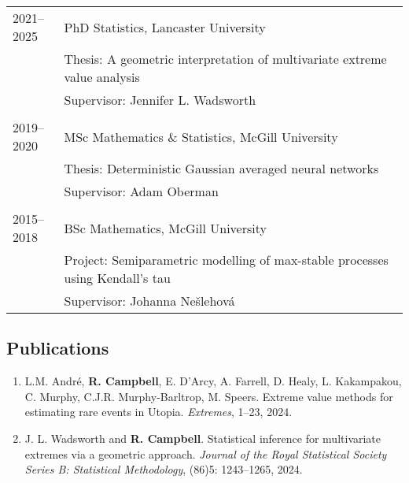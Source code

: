 \documentclass[11pt,]{scrartcl}
\begin{document}
\begin{table}[h]
{\def\arraystretch{1.1}\tabcolsep=0pt
\begin{tabular}{p{0.13\linewidth}p{0.87\linewidth}}

  {2021--2025} & PhD Statistics, Lancaster University \\
  & Thesis: A geometric interpretation of multivariate extreme value analysis\\
  & Supervisor: Jennifer L. Wadsworth \\ \\
  
  {2019--2020}  & MSc Mathematics \& Statistics, McGill University \\
  & Thesis: Deterministic Gaussian averaged neural networks \\
  & Supervisor: Adam Oberman \\  \\

  2015--2018 & BSc Mathematics, McGill University \\
  & Project: Semiparametric modelling of max-stable processes using Kendall's tau \\
  & Supervisor: Johanna Ne\v{s}lehov\'{a} \\

\end{tabular}%
}
\end{table}


\subsection{Publications}
\begin{enumerate}
  \leftskip-0.13in %
  \item L.M. André, \textbf{R. Campbell}, E. D'Arcy, A. Farrell, D. Healy, L. Kakampakou, C. Murphy, C.J.R. Murphy-Barltrop, M. Speers. Extreme value methods for estimating rare events in Utopia. \emph{Extremes}, 1--23, 2024.
  \item J. L. Wadsworth and \textbf{R. Campbell}. Statistical inference for multivariate extremes via a geometric approach. \emph{Journal of the Royal Statistical Society Series B: Statistical Methodology}, (86)5: 1243--1265, 2024.
\end{enumerate}
\end{document}
